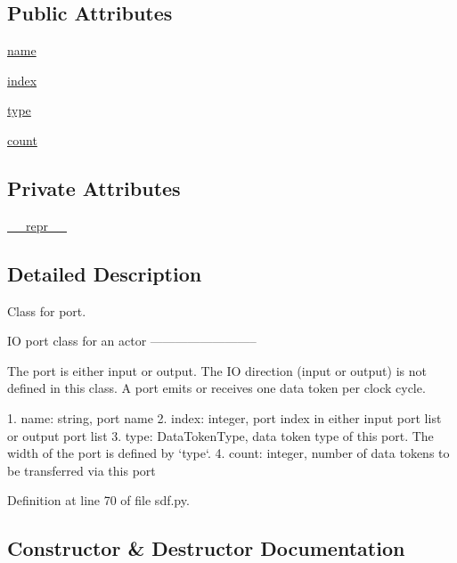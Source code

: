 \subsection*{Public Attributes}
\begin{DoxyCompactItemize}
\item 
\hyperlink{classsylva_1_1base_1_1sdf_1_1port_ace0eb23bb9f3e4a75e6a94f0961a6f99}{name}
\item 
\hyperlink{classsylva_1_1base_1_1sdf_1_1port_a4ed6db96ef0a6fb3d9b8f36c59bf7bdd}{index}
\item 
\hyperlink{classsylva_1_1base_1_1sdf_1_1port_af04b13138d55895bfd1083eb3e772f58}{type}
\item 
\hyperlink{classsylva_1_1base_1_1sdf_1_1port_a628b66dd64830393bcf8d88b85023016}{count}
\end{DoxyCompactItemize}
\subsection*{Private Attributes}
\begin{DoxyCompactItemize}
\item 
\hyperlink{classsylva_1_1base_1_1sdf_1_1port_a14e2fb1373bce5c98b5f779012db8a0b}{\+\_\+\+\_\+repr\+\_\+\+\_\+}
\end{DoxyCompactItemize}


\subsection{Detailed Description}
Class for port. 

\begin{DoxyVerb}  IO port class for an actor
  --------------------------

  The port is either input or output.
  The IO direction (input or output) is not defined in this class.
  A port emits or receives one data token per clock cycle.

  1. name: string, port name
  2. index: integer, port index in either input port list or output port list
  3. type: DataTokenType, data token type of this port.
    The width of the port is defined by `type`.
  4. count: integer, number of data tokens to be transferred via this port
\end{DoxyVerb}
 

Definition at line 70 of file sdf.\+py.



\subsection{Constructor \& Destructor Documentation}
\mbox{\label{classsylva_1_1base_1_1sdf_1_1port_a648789838e7d9ff8d8cd26537ed006ad}} 
